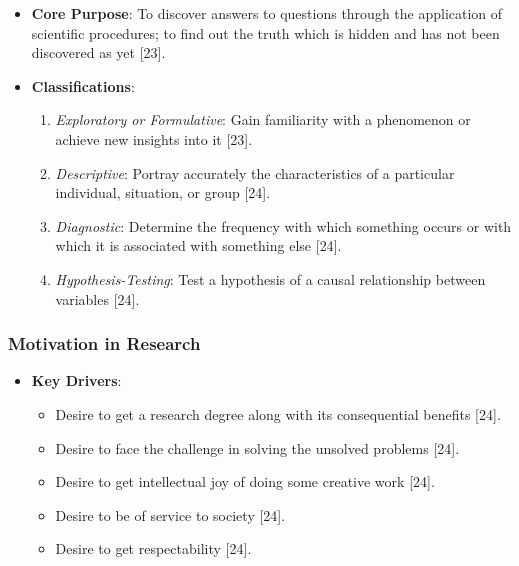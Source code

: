 \documentclass[
]{article}
\providecommand{\tightlist}{%
  \setlength{\itemsep}{0pt}\setlength{\parskip}{0pt}}
\begin{document}
\begin{itemize}
\tightlist
\item
  \textbf{Core Purpose}: To discover answers to questions through the
  application of scientific procedures; to find out the truth which is
  hidden and has not been discovered as yet {[}23{]}.
\item
  \textbf{Classifications}:

  \begin{enumerate}
  \def\labelenumi{\arabic{enumi}.}
  \tightlist
  \item
    \emph{Exploratory or Formulative}: Gain familiarity with a
    phenomenon or achieve new insights into it {[}23{]}.
  \item
    \emph{Descriptive}: Portray accurately the characteristics of a
    particular individual, situation, or group {[}24{]}.
  \item
    \emph{Diagnostic}: Determine the frequency with which something
    occurs or with which it is associated with something else {[}24{]}.
  \item
    \emph{Hypothesis-Testing}: Test a hypothesis of a causal
    relationship between variables {[}24{]}.
  \end{enumerate}
\end{itemize}

\subsubsection{Motivation in Research}\label{motivation-in-research}

\begin{itemize}
\tightlist
\item
  \textbf{Key Drivers}:

  \begin{itemize}
  \tightlist
  \item
    Desire to get a research degree along with its consequential
    benefits {[}24{]}.
  \item
    Desire to face the challenge in solving the unsolved problems
    {[}24{]}.
  \item
    Desire to get intellectual joy of doing some creative work {[}24{]}.
  \item
    Desire to be of service to society {[}24{]}.
  \item
    Desire to get respectability {[}24{]}.
  \end{itemize}
\end{itemize}
\end{document}
